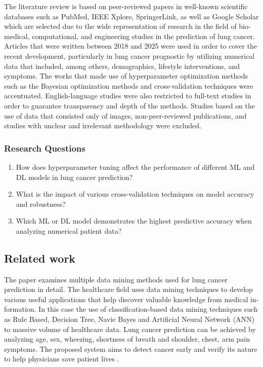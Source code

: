 \documentclass[runningheads]{llncs}
\begin{document}
The literature review is based on peer-reviewed papers in well-known scientific databases such as PubMed, IEEE Xplore, SpringerLink, as well as Google Scholar which are selected due to the wide representation of research in the field of bio-medical, computational, and engineering studies in the prediction of lung cancer. Articles that were written between 2018 and 2025 were used in order to cover the recent development, particularly in lung cancer prognostic by utilizing numerical data that included, among others, demographics, lifestyle interventions, and symptoms. The works that made use of hyperparameter optimization methods such as the Bayesian optimization methods and cross-validation techniques were accentuated. English-language studies were also restricted to full-text studies in order to guarantee transparency and depth of the methods. Studies based on the use of data that consisted only of images, non-peer-reviewed publications, and studies with unclear and irrelevant methodology were excluded. 


\subsubsection{Research Questions} 
\begin{enumerate}
    \item How does hyperparameter tuning affect the performance of different ML and DL models in lung cancer prediction?
    \item What is the impact of various cross-validation techniques on model accuracy and robustness?
    \item Which ML or DL model demonstrates the highest predictive accuracy when analyzing numerical patient data?
\end{enumerate}


\subsection{Related work}

The paper examines multiple data mining methods used for lung cancer prediction in detail. The healthcare field uses data mining techniques to develop various useful applications that help discover valuable knowledge from medical in-formation. In this case the use of classification-based data mining techniques such as Rule Based, Decision Tree, Navie Bayes and Artificial Neural Network (ANN) to massive volume of healthcare data. Lung cancer prediction can be achieved by analyzing age, sex, wheezing, shortness of breath and shoulder, chest, arm pain symptoms. The proposed system aims to detect cancer early and verify its nature to help physicians save patient lives \cite{heuvelmans2021}. 
\end{document}
